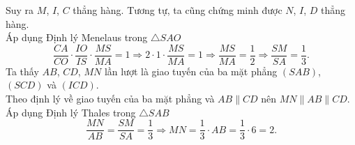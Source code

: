 \begin{ex}
{		Suy ra $M$,  $I$, $C$ thẳng hàng.
		Tương tự,  ta cũng chứng minh được $N$, $I$, $D$ thẳng hàng.\\
		Áp dụng Định lý Menelaus  trong $\triangle SAO$\\
		$$\dfrac{CA}{CO}\cdot  \dfrac{IO}{IS} \cdot \dfrac{MS}{MA} = 1\Rightarrow 2\cdot 1\cdot \dfrac{MS}{MA} = 1\Rightarrow \dfrac{MS}{MA} = \dfrac{1}{2}\Rightarrow \dfrac{SM}{SA} = \dfrac{1}{3}.$$
		Ta thấy $AB$, $CD$, $MN$ lần lượt là giao  tuyến của ba mặt phẳng $(SAB)$, $(SCD)$ và $(ICD)$.\\
		Theo định lý về giao tuyến của ba mặt phẳng và $AB \parallel CD$ nên $MN \parallel AB \parallel CD$.\\ 
		Áp dụng Định lý Thales  trong $\triangle SAB$
		$$\dfrac{MN}{AB} = \dfrac{SM}{SA} = \dfrac{1}{3}\Rightarrow MN = \dfrac{1}{3}\cdot  AB = \dfrac{1}{3}\cdot 6 = 2.$$
	 }
\end{ex}

